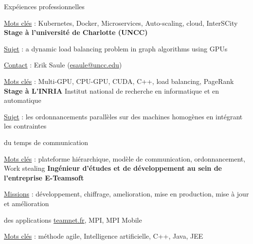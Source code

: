 \begin{rubric}{Expéiences professionnelles}
   \hfill {}
	\par \underline{Mots clés} : Kubernetes, Docker, Microservices, Auto-scaling, cloud, InterSCity
%
\entry*[]
 \textbf{Stage à l’université de Charlotte (UNCC)}
     \hfill{} 
	\par \underline{Sujet} : a dynamic load balancing problem in graph algorithms using GPUs
	\hfill {}
    \par \underline{Contact} : Erik Saule (\href{mailto:esaule@uncc.edu}{esaule@uncc.edu})
    \hfill {}
	\par \underline{Mots clés} : Multi-GPU, CPU-GPU, CUDA, C++, load balancing, PageRank
%
\entry*[]
    \textbf{Stage à L'INRIA} Institut national de recherche en informatique et en automatique
     \hfill{} 
	\par \underline{Sujet} : les ordonnancements parallèles sur des machines homogènes en intégrant les contraintes
	\hfill {}
    \par  du temps de communication
    \hfill {}
	\par \underline{Mots clés} : plateforme hiérarchique, modèle de communication, ordonnancement, Work stealing
%
%
\entry*[]
	\textbf{Ingénieur d'études et de développement au sein de l’entreprise E-Teamsoft}
     \hfill{} 
	\par \underline{Missions} : développement, chiffrage, amelioration, mise en production,
                              mise à jour et amélioration
    \hfill {}
    \par  des applications \href{http://teamnet.fr}{teamnet.fr}, MPI, MPI Mobile
    \hfill {}
    \par \underline{Mots clés} : méthode agile, Intelligence artificielle, C++, Java, JEE

\end{rubric}
